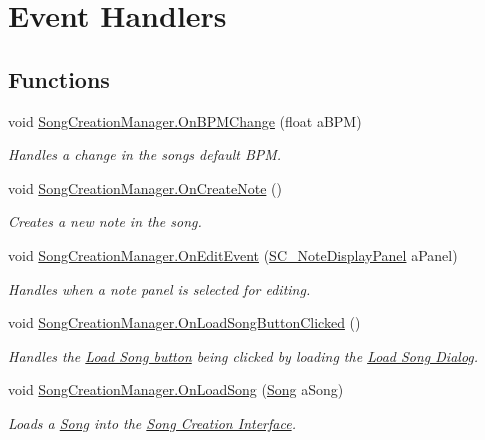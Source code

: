 \hypertarget{group___s_c_m_handlers}{}\section{Event Handlers}
\label{group___s_c_m_handlers}
\subsection*{Functions}
\begin{DoxyCompactItemize}
\item 
void \hyperlink{group___s_c_m_handlers_gae5930497314c77bd9c52c083b2f3e82e}{Song\+Creation\+Manager.\+On\+B\+P\+M\+Change} (float a\+B\+PM)
\begin{DoxyCompactList}\small\item\em Handles a change in the song\textquotesingle{}s default B\+PM. \end{DoxyCompactList}\item 
void \hyperlink{group___s_c_m_handlers_gaed512eb78e060a40616e6e31ce029440}{Song\+Creation\+Manager.\+On\+Create\+Note} ()
\begin{DoxyCompactList}\small\item\em Creates a new note in the song. \end{DoxyCompactList}\item 
void \hyperlink{group___s_c_m_handlers_gacb552a4f02b22d7c10a8420eb1431201}{Song\+Creation\+Manager.\+On\+Edit\+Event} (\hyperlink{class_s_c___note_display_panel}{S\+C\+\_\+\+Note\+Display\+Panel} a\+Panel)
\begin{DoxyCompactList}\small\item\em Handles when a note panel is selected for editing. \end{DoxyCompactList}\item 
void \hyperlink{group___s_c_m_handlers_ga1747d021ddb36a8c2c172315d6fbb3a8}{Song\+Creation\+Manager.\+On\+Load\+Song\+Button\+Clicked} ()
\begin{DoxyCompactList}\small\item\em Handles the \hyperlink{group___s_c_m_priv_var_ga7851ecd194d87e14fa186fc76e154222}{Load Song button} being clicked by loading the \hyperlink{group___doc_s_c___l_s_d}{Load Song Dialog}. \end{DoxyCompactList}\item 
void \hyperlink{group___s_c_m_handlers_gae3791e700c2e12f1dd705c4b951ec260}{Song\+Creation\+Manager.\+On\+Load\+Song} (\hyperlink{class_song}{Song} a\+Song)
\begin{DoxyCompactList}\small\item\em Loads a \hyperlink{class_song}{Song} into the \hyperlink{group___doc_s_c}{Song Creation Interface}. \end{DoxyCompactList}\item 

\end{DoxyCompactItemize}
